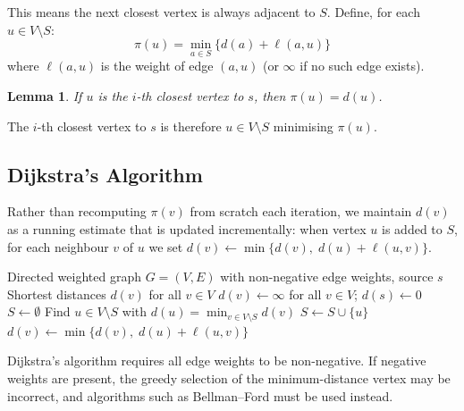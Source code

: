 \documentclass[11pt, a4paper, notitlepage]{report}
\newtheorem{lemma}[theorem]{Lemma}
\theoremstyle{definition}
\theoremstyle{remark}
\begin{document}
This means the next closest vertex is always adjacent to $S$. Define, for each $u \in V \setminus S$:
\[
  \pi(u) = \min_{a \in S} \{ d(a) + \ell(a, u) \}
\]
where $\ell(a,u)$ is the weight of edge $(a,u)$ (or $\infty$ if no such edge exists).

\begin{lemma}
\label{lem:pi-equals-d}
If $u$ is the $i$-th closest vertex to $s$, then $\pi(u) = d(u)$.
\end{lemma}

The $i$-th closest vertex to $s$ is therefore $u \in V \setminus S$ minimising $\pi(u)$.

\subsection{Dijkstra's Algorithm}
\label{subsec:dijkstra}

Rather than recomputing $\pi(v)$ from scratch each iteration, we maintain $d(v)$ as a running estimate that is updated incrementally: when vertex $u$ is added to $S$, for each neighbour $v$ of $u$ we set $d(v) \gets \min\{d(v),\; d(u) + \ell(u,v)\}$.

\begin{algorithm}[H]
\caption{Dijkstra's Algorithm}
\label{alg:dijkstra}
\begin{algorithmic}[1]
\Require Directed weighted graph $G = (V, E)$ with non-negative edge weights, source $s$
\Ensure Shortest distances $d(v)$ for all $v \in V$
\State $d(v) \gets \infty$ for all $v \in V$; \quad $d(s) \gets 0$
\State $S \gets \emptyset$
  \State Find $u \in V \setminus S$ with $d(u) = \min_{v \in V \setminus S} d(v)$
  \State $S \gets S \cup \{u\}$
    \State $d(v) \gets \min\{d(v),\; d(u) + \ell(u,v)\}$
  \EndFor
\EndWhile
\end{algorithmic}
\end{algorithm}

\begin{warning}[title={Warning: Non-Negative Weights Required}]
Dijkstra's algorithm requires all edge weights to be non-negative. If negative weights are present, the greedy selection of the minimum-distance vertex may be incorrect, and algorithms such as Bellman--Ford must be used instead.
\end{warning}
\end{document}
